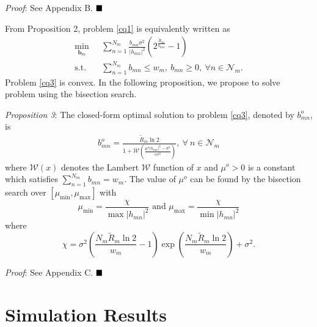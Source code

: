 \documentclass[journal]{IEEEtran}
\begin{document}
\textit{Proof}: See Appendix B. $\hfill\blacksquare$

From Proposition 2, problem \eqref{cq1} is equivalently written as
\begin{align}\label{cq3}
\min_{\mathbf{b}_{m}}\ & \sum\limits_{n= 1}^{N_m} \frac{b_{mn}\sigma^2}{\left|h_{mn}\right|^2}\left(2^{\frac{\tilde{R}_m}{b_{mn}}} - 1\right) \nonumber \\ \mbox{s.t.} \quad &  \sum\limits_{n=1}^{N_m} b_{mn} \leq w_m,\ b_{mn} \geq 0,\ \forall n\in\mathcal{N}_m.
\end{align}
Problem \eqref{cq3} is convex. In the following proposition, we propose to solve problem using the bisection search.

\textit{Proposition 3}: The closed-form optimal solution to problem \eqref{cq3}, denoted by $b_{mn}^o$, is
\begin{align}\label{cq4}
b_{mn}^o= \frac{\tilde{R}_m\ln2}{1 + \mathcal{W}\left(\frac{\mu^o\left|h_{mn}\right|^2 - \sigma^2}{e\sigma^2}\right)},\ \forall\ n\in\mathcal{N}_m
\end{align}
where $\mathcal{W}\left(x\right)$ denotes the Lambert $\mathcal{W}$ function of $x$ \cite{RMCorless} and $\mu^o>0$ is a constant which satisfies $\sum_{n=1}^{N_m} b_{mn}=w_m$. The value of $\mu^o$ can be found by the bisection search over $\left[\mu_{\min}, \mu_{\max}\right]$ with
\begin{equation}\label{cq5}
\mu_{\min}=\frac{\chi}{\max\left|h_{mn}\right|^2} \mbox{ and } \mu_{\max}=\frac{\chi}{\min\left|h_{mn}\right|^2}
\end{equation}
where
\begin{equation}
\chi=\sigma^2\left(\frac{N_m\tilde{R}_m\ln2}{w_m} - 1\right)\exp\left(\frac{N_m\tilde{R}_m\ln2}{w_m}\right) + \sigma^2.
\end{equation}

\textit{Proof}: See Appendix C.  $\hfill\blacksquare$

\section{Simulation Results}
\end{document}
